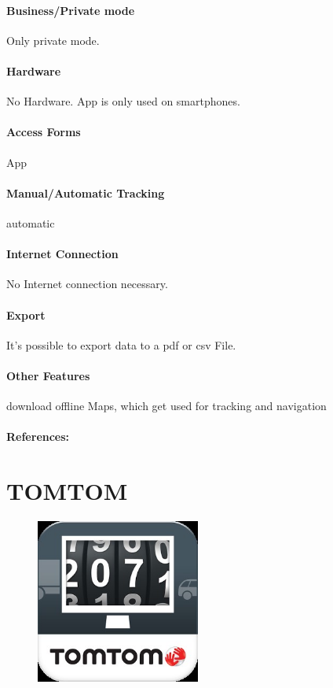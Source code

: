 \paragraph{Business/Private mode} Only private mode.
\paragraph{Hardware} No Hardware. App is only used on smartphones.
\paragraph{Access Forms} App
\paragraph{Manual/Automatic Tracking} automatic
\paragraph{Internet Connection} No Internet connection necessary.
\paragraph{Export} It’s possible to export data to a \gls{pdf} or \gls{csv} File.
\paragraph{Other Features} download offline Maps, which get used for tracking and navigation
\paragraph{References:} \cite{osmand}
\newpage

\section{TOMTOM}
\begin{figure}
  \begin{center}
    \includegraphics[width=0.48\textwidth]{bilder/tomtom}
  \end{center}
\end{figure}
